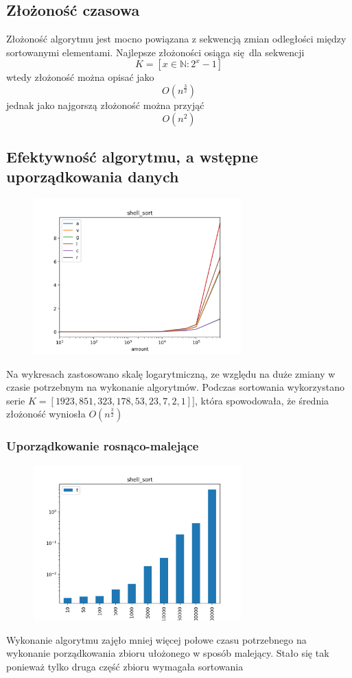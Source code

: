 \documentclass[]{article}
\begin{document}
	\subsection{Złożoność czasowa}
		Złożoność algorytmu jest mocno powiązana z sekwencją zmian odległości między sortowanymi elementami. Najlepsze złożoności osiąga się dla sekwencji
		\[
		K = [x \in \mathbb{N}: 2^x - 1]
		\]
		wtedy złożoność można opisać jako
		\[
		O(n^{\frac{3}{2}})
		\]
		jednak jako najgorszą złożoność można przyjąć
		\[
		O(n^2)
		\]
	\subsection{Efektywność algorytmu, a wstępne uporządkowania danych}
		\begin{figure}[H]
			\centering
			\includegraphics[width=8cm]{shell_sort_gather.png}	
		\end{figure}
		Na wykresach zastosowano skalę logarytmiczną, ze względu na duże zmiany w czasie potrzebnym na wykonanie algorytmów.
		Podczas sortowania wykorzystano serie $ K = [1923, 851, 323, 178, 53, 23, 7, 2, 1]] $, która spowodowała, że średnia złożoność wyniosła $ O(n^\frac{3}{2})$
		\subsubsection{Uporządkowanie rosnąco-malejące}
		\begin{figure}[H]
			\centering
			\includegraphics[width=8cm]{shell_sort_a.png}	
		\end{figure}
		Wykonanie algorytmu zajęło mniej więcej połowe czasu potrzebnego na wykonanie porządkowania zbioru ułożonego w sposób malejący. Stało się tak ponieważ tylko druga część zbioru wymagała sortowania
\end{document}
